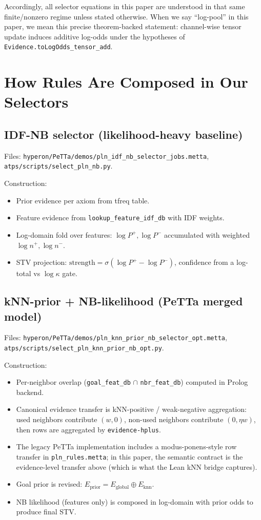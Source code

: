 \documentclass[11pt]{article}
\newcommand{\lpath}[1]{\texttt{\nolinkurl{#1}}}
\newcommand{\lid}[1]{{\ttfamily\nolinkurl{#1}}}
\begin{document}
\noindent
Accordingly, all selector equations in this paper are understood in that same
finite/nonzero regime unless stated otherwise.
When we say ``log-pool'' in this paper, we mean this precise theorem-backed
statement: channel-wise tensor update induces additive log-odds under the
hypotheses of \lid{Evidence.toLogOdds_tensor_add}.

\section{How Rules Are Composed in Our Selectors}
\subsection{IDF-NB selector (likelihood-heavy baseline)}
Files:
\lpath{hyperon/PeTTa/demos/pln_idf_nb_selector_jobs.metta},
\lpath{atps/scripts/select_pln_nb.py}.

Construction:
\begin{itemize}
\item Prior evidence per axiom from tfreq table.
\item Feature evidence from \lid{lookup_feature_idf_db} with IDF weights.
\item Log-domain fold over features:
      \(\log P^+,\log P^-\) accumulated with weighted \(\log n^+,\log n^-\).
\item STV projection:
      \(\mathrm{strength}=\sigma(\log P^+-\log P^-)\),
      confidence from a log-total vs \(\log\kappa\) gate.
\end{itemize}

\subsection{kNN-prior + NB-likelihood (PeTTa merged model)}
Files:
\lpath{hyperon/PeTTa/demos/pln_knn_prior_nb_selector_opt.metta},
\lpath{atps/scripts/select_pln_knn_prior_nb_opt.py}.

Construction:
\begin{itemize}
\item Per-neighbor overlap (\texttt{goal\_feat\_db} $\cap$ \texttt{nbr\_feat\_db})
      computed in Prolog backend.
\item Canonical evidence transfer is kNN-positive / weak-negative aggregation:
      used neighbors contribute \((w,0)\), non-used neighbors contribute
      \((0,\eta w)\), then rows are aggregated by \lid{evidence-hplus}.
\item The legacy PeTTa implementation includes a modus-ponens-style row transfer
      in \lpath{pln_rules.metta}; in this paper, the semantic contract is the
      evidence-level transfer above (which is what the Lean kNN bridge captures).
\item Goal prior is revised:
      \(E_{\text{prior}}=E_{\text{global}} \oplus E_{\text{knn}}\).
\item NB likelihood (features only) is composed in log-domain with
      prior odds to produce final STV.
\end{itemize}
\end{document}
